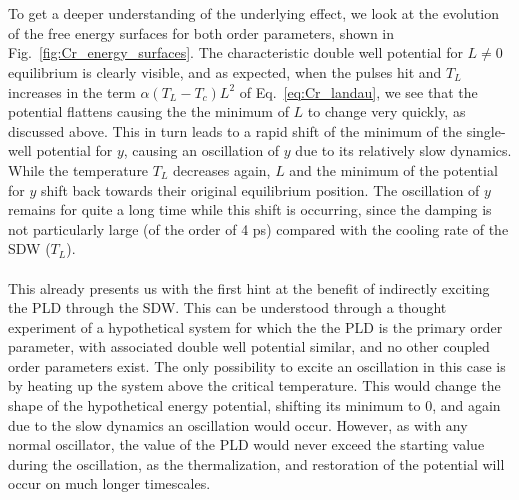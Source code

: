 \\\\
To get a deeper understanding of the underlying effect, we look at the evolution of the free energy surfaces for both order parameters, shown in Fig.~\ref{fig:Cr_energy_surfaces}.
The characteristic double well potential for $L\neq0$ equilibrium is clearly visible, and as expected, when the pulses hit and $T_L$ increases in the term $\alpha(T_L-T_c)L^2$ of Eq.~\eqref{eq:Cr_landau}, we see that the potential flattens causing the the minimum of $L$ to change very quickly, as discussed above.
This in turn leads to a rapid shift of the minimum of the single-well potential for $y$, causing an oscillation of $y$ due to its relatively slow dynamics.
While the temperature $T_L$ decreases again, $L$ and the minimum of the potential for $y$ shift back towards their original equilibrium position.
The oscillation of $y$ remains for quite a long time while this shift is occurring, since the damping is not particularly large (of the order of 4 ps) compared with the cooling rate of the SDW ($T_L$).
\\\\
This already presents us with the first hint at the benefit of indirectly exciting the PLD through the SDW.
This can be understood through a thought experiment of a hypothetical system for which the the PLD is the primary order parameter, with associated double well potential similar, and no other coupled order parameters exist.
The only possibility to excite an oscillation in this case is by heating up the system above the critical temperature.
This would change the shape of the hypothetical energy potential, shifting its minimum to 0, and again due to the slow dynamics an oscillation would occur.
However, as with any normal oscillator, the value of the PLD would never exceed the starting value during the oscillation, as the thermalization, and restoration of the potential will occur on much longer timescales.

